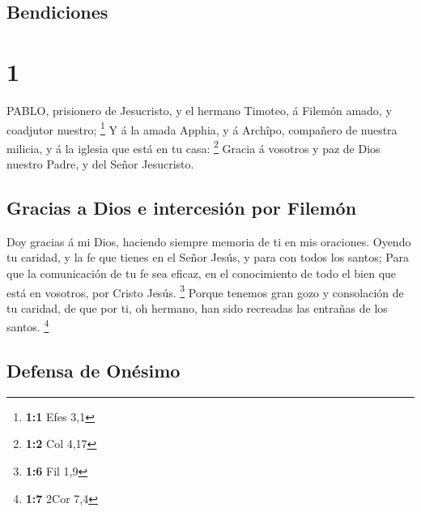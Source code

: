 \hypertarget{bendiciones}{%
\subsection{Bendiciones}\label{bendiciones}}

\hypertarget{section}{%
\section{1}\label{section}}

 PABLO, prisionero de Jesucristo, y el hermano Timoteo, á
Filemón amado, y coadjutor nuestro; \footnote{\textbf{1:1} Efes 3,1}
 Y á la amada Apphia, y á Archîpo, compañero de nuestra
milicia, y á la iglesia que está en tu casa: \footnote{\textbf{1:2} Col
  4,17}  Gracia á vosotros y paz de Dios nuestro Padre, y
del Señor Jesucristo.

\hypertarget{gracias-a-dios-e-intercesiuxf3n-por-filemuxf3n}{%
\subsection{Gracias a Dios e intercesión por
Filemón}\label{gracias-a-dios-e-intercesiuxf3n-por-filemuxf3n}}

 Doy gracias á mi Dios, haciendo siempre memoria de ti en
mis oraciones.  Oyendo tu caridad, y la fe que tienes en el
Señor Jesús, y para con todos los santos;  Para que la
comunicación de tu fe sea eficaz, en el conocimiento de todo el bien que
está en vosotros, por Cristo Jesús. \footnote{\textbf{1:6} Fil 1,9}
 Porque tenemos gran gozo y consolación de tu caridad, de
que por ti, oh hermano, han sido recreadas las entrañas de los santos.
\footnote{\textbf{1:7} 2Cor 7,4}

\hypertarget{defensa-de-onuxe9simo}{%
\subsection{Defensa de Onésimo}\label{defensa-de-onuxe9simo}}

